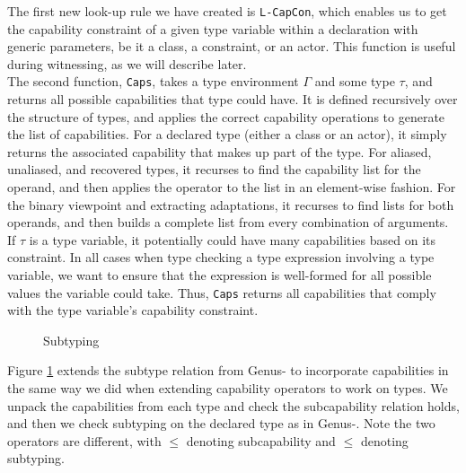 The first new look-up rule we have created is \texttt{L-CapCon}, which enables us to get the capability constraint of a given type variable within a declaration with generic parameters, be it a class, a constraint, or an actor. This function is useful during witnessing, as we will describe later. \\

The second function, \texttt{Caps}, takes a type environment $\Gamma$ and some type $\tau$, and returns all possible capabilities that type could have. It is defined recursively over the structure of types, and applies the correct capability operations to generate the list of capabilities. For a declared type (either a class or an actor), it simply returns the associated capability that makes up part of the type. For aliased, unaliased, and recovered types, it recurses to find the capability list for the operand, and then applies the operator to the list in an element-wise fashion. For the binary viewpoint and extracting adaptations, it recurses to find lists for both operands, and then builds a complete list from every combination of arguments. \\

If $\tau$ is a type variable, it potentially could have many capabilities based on its constraint. In all cases when type checking a type expression involving a type variable, we want to ensure that the expression is well-formed for all possible values the variable could take. Thus, \texttt{Caps} returns all capabilities that comply with the type variable's capability constraint.

\begin{figure}[H]
    \centering
    \begin{mathpar}
    \end{mathpar}
    \caption{Subtyping}
    \label{fig:degen-subtype}
\end{figure}

Figure \ref{fig:degen-subtype} extends the subtype relation from Genus- to incorporate capabilities in the same way we did when extending capability operators to work on types. We unpack the capabilities from each type and check the subcapability relation holds, and then we check subtyping on the declared type as in Genus-. Note the two operators are different, with $\leqslant$ denoting subcapability and $\leq$ denoting subtyping.

